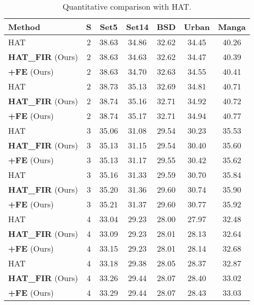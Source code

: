 \documentclass[10pt,twocolumn,letterpaper]{article}
\begin{document}
\begin{table}[!t]
	\centering
\scalebox{0.81}
		{
		\begin{tabular}{lcccccc}
			\hline
Method & S & Set5 & Set14 & BSD & Urban & Manga
			\\ 
			\hline
			\hline
			HAT & 2
			& 38.63
			& 34.86
			& 32.62
			& 34.45
			& 40.26
			\\
			\textbf{HAT\_FIR} (Ours) & 2
			& 38.63
			& 34.63
			& 32.62
			& 34.47
			& 40.39
			\\
			\textbf{+FE} (Ours) & 2
			& 38.63
			& 34.70
			& 32.63
			& 34.55
			& 40.41
			\\
			\hdashline
			HAT & 2
			& 38.73
			& 35.13
			& 32.69
			& 34.81
			& 40.71
			\\
			\textbf{HAT\_FIR} (Ours) & 2
			& 38.74
			& 35.16
			& 32.71
			& 34.92
			& 40.72
			\\
			\textbf{+FE} (Ours) & 2
			& 38.74
			& 35.17
			& 32.71
			& 34.94
			& 40.77
			\\
			\hline
			\hline
			HAT & 3
			& 35.06
			& 31.08
			& 29.54
			& 30.23
			& 35.53
			\\
			\textbf{HAT\_FIR} (Ours) & 3
			& 35.13
			& 31.15
			& 29.54
			& 30.40
			& 35.60
			\\
			\textbf{+FE} (Ours) & 3
			& 35.13
			& 31.17
			& 29.55
			& 30.42
			& 35.62
			\\
			\hdashline
			HAT & 3
			& 35.16
			& 31.33
			& 29.59
			& 30.70
			& 35.84
			\\
			\textbf{HAT\_FIR} (Ours) & 3
			& 35.20
			& 31.36
			& 29.60
			& 30.74
			& 35.90
			\\
			\textbf{+FE} (Ours) & 3
			& 35.21
			& 31.37
			& 29.60
			& 30.77
			& 35.92
			\\
			\hline
			\hline
			HAT & 4
			& 33.04
			& 29.23
			& 28.00
			& 27.97
			& 32.48
			\\
			\textbf{HAT\_FIR} (Ours) & 4
			& 33.09
			& 29.23
			& 28.01
			& 28.13
			& 32.64
			\\
			\textbf{+FE} (Ours) & 4
			& 33.15
			& 29.23
			& 28.01
			& 28.14
			& 32.68
			\\
			\hdashline
			HAT & 4
			& 33.18
			& 29.38
			& 28.05
			& 28.37
			& 32.87
			\\
			\textbf{HAT\_FIR} (Ours) & 4
			& 33.26
			& 29.44
			& 28.07
			& 28.40
			& 33.02
			\\
			\textbf{+FE} (Ours) & 4
			& 33.29
			& 29.44
			& 28.07
			& 28.43
			& 33.03
			\\
			\hline             
		\end{tabular}}
\caption{Quantitative comparison with HAT.}
		\label{tab:HATFIR_quantitative_results}
\end{table}
\end{document}

